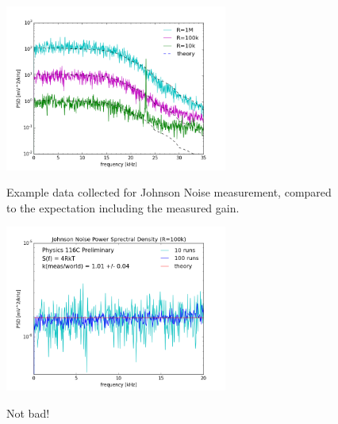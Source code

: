\documentclass[12pt]{article}
\begin{document}
\begin{figure}[htbp]
\begin{center}
{\includegraphics[width=0.65\textwidth]{figs/compare_psd.png}}
\end{center}
\caption{\label{fig:compare_psd}  Example data collected for Johnson Noise measurement, compared to the expectation including the measured gain.}\end{figure}

\begin{figure}[htbp]
\begin{center}
{\includegraphics[width=0.65\textwidth]{figs/noise.png}}
\end{center}
\caption{\label{fig:noise}  Not bad! }\end{figure}
\end{document}
